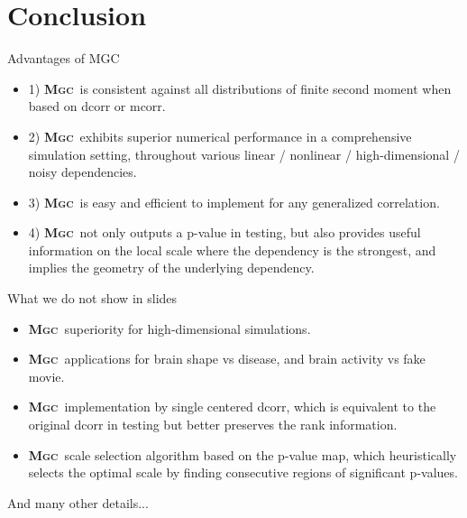\documentclass{beamer}
\providecommand{\sct}[1]{{\normalfont\textsc{#1}}}
\newcommand{\Mgc}{\textbf{\sct{Mgc}}}
\begin{document}
\section{Conclusion}
\begin{frame}{Advantages of MGC}
\begin{itemize}[<+->]
\item 1) \Mgc~is consistent against all distributions of finite second moment when based on dcorr or mcorr.
\item 2) \Mgc~exhibits superior numerical performance in a comprehensive simulation setting, throughout various linear / nonlinear / high-dimensional / noisy dependencies.
\item 3) \Mgc~is easy and efficient to implement for any generalized correlation.
\item 4) \Mgc~not only outputs a p-value in testing, but also provides useful information on the local scale where the dependency is the strongest, and implies the geometry of the underlying dependency.
\end{itemize}
\end{frame}

\begin{frame}{What we do not show in slides}
\begin{itemize}[<+->]
\item \Mgc~superiority for high-dimensional simulations.
\item \Mgc~applications for brain shape vs disease, and brain activity vs fake movie.
\item \Mgc~implementation by single centered dcorr, which is equivalent to the original dcorr in testing but better preserves the rank information.
\item \Mgc~scale selection algorithm based on the p-value map, which heuristically selects the optimal scale by finding consecutive regions of significant p-values.
\end{itemize}
\pause
\medskip
And many other details...
\end{frame}

\end{document}
